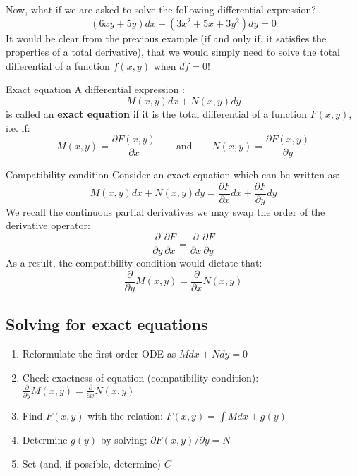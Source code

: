 Now, what if we are asked to solve the following differential expression?
\begin{equation*}
(6xy+5y)dx+(3x^{2}+5x+3y^{2})dy=0
\end{equation*}
It would be clear from the previous example (if and only if, it satisfies the properties of a total derivative), that we would simply need to solve the total differential of a function $f(x,y)$ when $df=0$!\\



\begin{defin}{Exact equation}{}
A differential expression :
 \begin{equation*}
M(x,y) dx+N(x,y)dy
\end{equation*}
is called an \textbf{exact equation} if it is the total differential of a function $F(x,y)$, i.e. if:
 \begin{equation*}
M(x,y) =\frac{\partial F(x,y)}{\partial x} \qquad \text{and} \qquad N(x,y) =\frac{\partial F(x,y)}{\partial y}
\end{equation*}
\end{defin}


\begin{defin}{Compatibility condition}{}
Consider an exact equation which can be written as:
 \begin{equation*}
M(x,y) dx+N(x,y)dy=\frac{\partial F}{\partial x}dx+\frac{\partial F}{\partial y}dy
\end{equation*}
We recall the continuous partial derivatives we may swap the order of the derivative operator:
\begin{equation*}
\frac{\partial}{\partial y}\frac{\partial F}{\partial x}=\frac{\partial}{\partial x}\frac{\partial F}{\partial y}
\end{equation*}
As a result, the compatibility condition would dictate that:
\begin{equation*}
\boxed{\frac{\partial}{\partial y}M(x,y)=\frac{\partial}{\partial x}N(x,y)}
\end{equation*}
\end{defin}




\subsection{Solving for exact equations}
\begin{enumerate}
\item Reformulate the first-order ODE as $Mdx+Ndy=0$
\item Check exactness of equation (compatibility condition): $\frac{\partial}{\partial y}M(x,y)=\frac{\partial}{\partial x}N(x,y)$
\item Find $F(x,y)$ with the relation: $F(x,y)=\int Mdx+g(y)$
\item Determine $g(y)$ by solving: $\partial F(x,y)/\partial y = N$
\item Set (and, if possible, determine) $C$
\end{enumerate}

